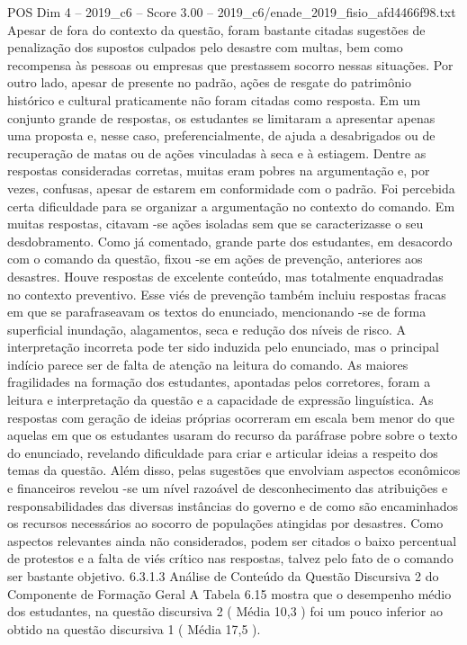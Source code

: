 \begin{textsample}{POS Dim 4 – 2019\_c6 – Score 3.00 – 2019\_c6/enade\_2019\_fisio\_afd4466f98.txt}
Apesar de fora do contexto da questão, foram bastante citadas sugestões de penalização dos supostos culpados pelo desastre com multas, bem como recompensa às pessoas ou empresas que prestassem socorro nessas situações.
Por outro lado, apesar de presente no padrão, ações de resgate do patrimônio histórico e cultural praticamente não foram citadas como resposta.
Em um conjunto grande de respostas, os estudantes se limitaram a apresentar apenas uma proposta e, nesse caso, preferencialmente, de ajuda a desabrigados ou de recuperação de matas ou de ações vinculadas à seca e à estiagem.
Dentre as respostas consideradas corretas, muitas eram pobres na argumentação e, por vezes, confusas, apesar de estarem em conformidade com o padrão.
Foi percebida certa dificuldade para se organizar a argumentação no contexto do comando.
Em muitas respostas, citavam -se ações isoladas sem que se caracterizasse o seu desdobramento.
Como já comentado, grande parte dos estudantes, em desacordo com o comando da questão, fixou -se em ações de prevenção, anteriores aos desastres.
Houve respostas de excelente conteúdo, mas totalmente enquadradas no contexto preventivo.
Esse viés de prevenção também incluiu respostas fracas em que se parafraseavam os textos do enunciado, mencionando -se de forma superficial inundação, alagamentos, seca e redução dos níveis de risco.
A interpretação incorreta pode ter sido induzida pelo enunciado, mas o principal indício parece ser de falta de atenção na leitura do comando.
As maiores fragilidades na formação dos estudantes, apontadas pelos corretores, foram a leitura e interpretação da questão e a capacidade de expressão linguística.
As respostas com geração de ideias próprias ocorreram em escala bem menor do que aquelas em que os estudantes usaram do recurso da paráfrase pobre sobre o texto do enunciado, revelando dificuldade para criar e articular ideias a respeito dos temas da questão.
Além disso, pelas sugestões que envolviam aspectos econômicos e financeiros revelou -se um nível razoável de desconhecimento das atribuições e responsabilidades das diversas instâncias do governo e de como são encaminhados os recursos necessários ao socorro de populações atingidas por desastres.
Como aspectos relevantes ainda não considerados, podem ser citados o baixo percentual de protestos e a falta de viés crítico nas respostas, talvez pelo fato de o comando ser bastante objetivo. 6.3.1.3 Análise de Conteúdo da Questão Discursiva 2 do Componente de Formação Geral A Tabela 6.15 mostra que o desempenho médio dos estudantes, na questão discursiva 2 ( Média 10,3 ) foi um pouco inferior ao obtido na questão discursiva 1 ( Média 17,5 ).

\end{textsample}
